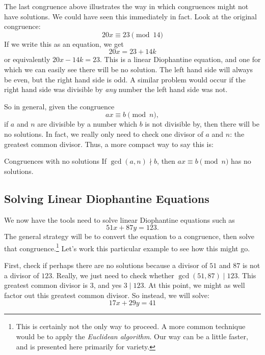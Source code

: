 \documentclass[12pt]{article}
\begin{document}
The last congruence above illustrates the way in which congruences might not have solutions.  We could have seen this immediately in fact.  Look at the original congruence:
\[20x \equiv 23 \pmod{14}\]
If we write this as an equation, we get 
\[20x = 23 + 14k\]
or equivalently $20x - 14k = 23$.  This is a linear Diophantine equation, and one for which we can easily see there will be no solution.  The left hand side will always be even, but the right hand side is odd.  A similar problem would occur if the right hand side was divisible by {\em any} number the left hand side was not.  

So in general, given the congruence
\[ax \equiv b \pmod{n},\]
if $a$ and $n$ are divisible by a number which $b$ is not divisible by, then there will be no solutions.  In fact, we really only need to check one divisor of $a$ and $n$: the greatest common divisor.  Thus, a more compact way to say this is:

\begin{defbox}{Congruences with no solutions}
 If $\gcd(a,n) \nmid b$, then $ax \equiv b \pmod{n}$ has no solutions.
\end{defbox}


\subsection{Solving Linear Diophantine Equations}


We now have the tools need to solve linear Diophantine equations such as 
\[51x + 87y = 123.\]
The general strategy will be to convert the equation to a congruence, then solve that congruence.\footnote{This is certainly not the only way to proceed.  A more common technique would be to apply the {\em Euclidean algorithm}.  Our way can be a little faster, and is presented here primarily for variety.} Let's work this particular example to see how this might go.

First, check if perhaps there are no solutions because a divisor of $51$ and $87$ is not a divisor of $123$.  Really, we just need to check whether $\gcd(51, 87) \mid 123$.  This greatest common divisor is 3, and yes $3 \mid 123$.  At this point, we might as well factor out this greatest common divisor.  So instead, we will solve:
\[17x + 29y = 41\]
\end{document}
